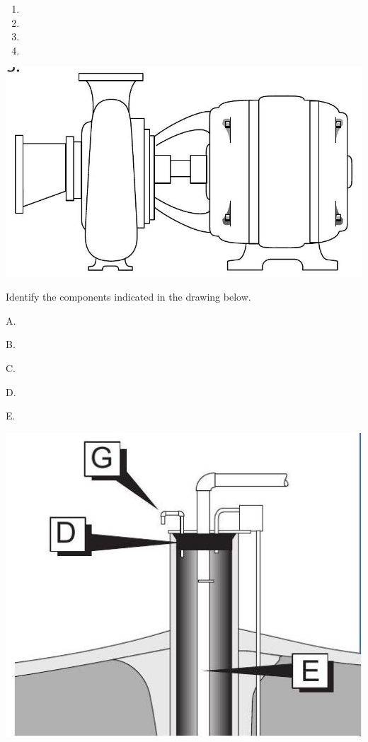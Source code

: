 \documentclass[10pt]{article}
\begin{document}
\begin{enumerate}
  \item 
  \item 
  \item 
  \item 
\end{enumerate}
\includegraphics[max width=\textwidth]{2022_11_03_65aa625ded296bdfd01fg-23(3)}

Identify the components indicated in the drawing below.

A.

B.

C.

D.

E.

\includegraphics[max width=\textwidth]{2022_11_03_65aa625ded296bdfd01fg-23(4)}
\end{document}
